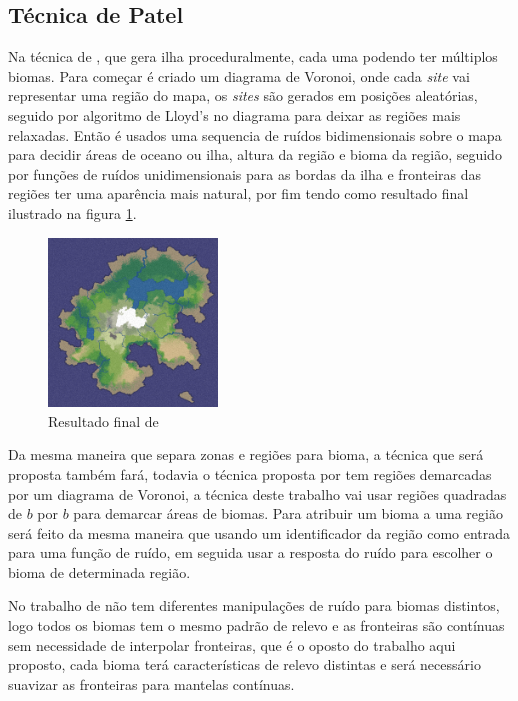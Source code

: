 \subsection{Técnica de Patel}
Na técnica de \cite{patel2010polygonal}, que gera ilha proceduralmente, cada uma podendo ter
múltiplos biomas. Para começar é criado um diagrama de Voronoi, onde cada \textit{site}
vai representar uma região do mapa, os \textit{sites} são gerados em posições
aleatórias, seguido por algoritmo de Lloyd's no diagrama para
deixar as regiões mais relaxadas.
Então é usados uma sequencia de ruídos bidimensionais sobre o mapa para decidir
áreas de oceano ou ilha, altura da região e bioma da região, seguido por funções
de ruídos unidimensionais para as bordas da ilha e fronteiras das regiões ter
uma aparência mais natural, por fim tendo como resultado final ilustrado na
figura \ref{fig:voronoi-map-goal-distorted}.
\begin{figure}[H]
    \centering
    \includegraphics[width=0.4\textwidth]{figuras/voronoi-map-goal-distorted.png}
    \caption{Resultado final de \cite{patel2010polygonal}}
    \label{fig:voronoi-map-goal-distorted}
\end{figure}

Da mesma maneira que \cite{patel2010polygonal} separa zonas e regiões para bioma,
a técnica que será proposta também fará, todavia o técnica proposta por \cite{patel2010polygonal}
tem regiões demarcadas por um diagrama de Voronoi, a técnica deste trabalho vai 
usar regiões quadradas de $b$ por $b$ para demarcar áreas de biomas.
Para atribuir um bioma a uma região será feito da mesma maneira que \cite{patel2010polygonal}
usando um identificador da região como entrada para uma função de ruído, em seguida
usar a resposta do ruído para escolher o bioma de determinada região.

No trabalho de \cite{patel2010polygonal} não tem diferentes manipulações de ruído
para biomas distintos, logo todos os biomas tem o mesmo padrão de relevo e as 
fronteiras são contínuas sem necessidade de interpolar fronteiras, que é o 
oposto do trabalho aqui proposto, cada bioma terá características de relevo distintas 
e será necessário suavizar as fronteiras para mantelas contínuas.

